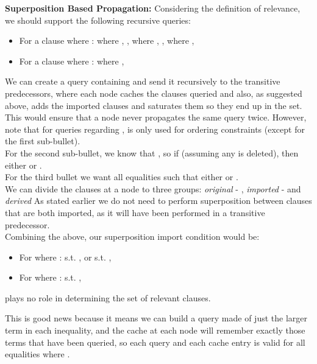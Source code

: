 \textbf{Superposition Based Propagation:}
Considering the definition of relevance, we should support the following recursive queries:
\begin{itemize}
	\item For a clause  where :
		\subitem {}
		\subitem {} where , , 
		\subitem {} where , , 
		\subitem {} where , 
	\item For a clause  where :
		\subitem {} where ,  
\end{itemize}
We can create a query containing  and send it recursively to the transitive predecessors, where each node caches the clauses queried and also, as suggested above, adds the imported clauses and saturates them so they end up in the  set.
This would ensure that a node never propagates the same query twice.
However, note that for queries regarding ,  is only used for ordering constraints (except for the first sub-bullet).\\
For the second sub-bullet, we know that ,
so if  (assuming any  is deleted), 
then either  or .\\
For the third bullet we want all equalities such that either  or .\\
We can divide the clauses at a node to three groups: \emph{original} - , \emph{imported} -  and \emph{derived}
As stated earlier we do not need to perform superposition between clauses that are both imported, as it will have been performed in a transitive predecessor.\\
Combining the above, our superposition import condition would be:
\begin{itemize}
	\item For  where :
		\subitem {} s.t. , or 
		\subitem {} s.t. ,
	\item For  where :
		\subitem {} s.t. , 
\end{itemize}
 plays no role in determining the set of relevant clauses.

This is good news because it means we can build a query made of just the larger term in each inequality, and the cache at each node will remember exactly those terms that have been queried, so each query and each cache entry  is valid for all equalities  where .


